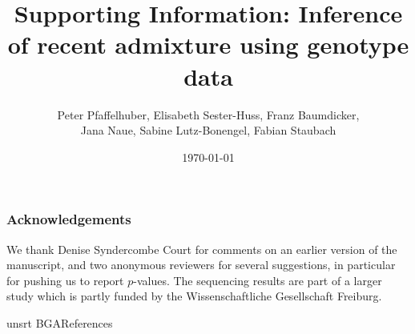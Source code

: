 \documentclass[12pt]{article}
\theoremstyle{definition}
\begin{document}






\subsubsection*{Acknowledgements}
We thank Denise Syndercombe Court for comments on an earlier version of the manuscript, {\color{blue} and two anonymous reviewers for several suggestions, in particular for pushing us to report $p$-values}. The sequencing results are part of a larger study which is partly funded by the Wissenschaftliche Gesellschaft Freiburg. 


{unsrt}
{BGA}{References}
% 

\newpage
\setcounter{page}{1}
\setcounter{section}{0}
\setcounter{figure}{0}
\setcounter{table}{0}
\setcounter{equation}{0}
\thispagestyle{empty}

\begin{center}
 \title{\LARGE Supporting Information: Inference
  of recent admixture using genotype data}

~~

\author{\sc Peter Pfaffelhuber, Elisabeth Sester-Huss, Franz Baumdicker, \\
  \sc Jana Naue, Sabine Lutz-Bonengel, Fabian Staubach}

~

\date{\today}

\maketitle
  
\end{center}

\renewcommand{\theequation}{S\arabic{equation}}
\renewcommand{\thefigure}{S\arabic{figure}}
\renewcommand{\thetable}{S\arabic{table}}
\renewcommand{\thesection}{S\arabic{section}}
\end{document}
